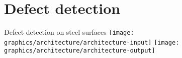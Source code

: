 \section{Defect detection}


\begin{frame}{Defect detection on steel surfaces}
     {
        \texttt{[image: graphics/architecture/architecture-input]}
    }
     {
        \texttt{[image: graphics/architecture/architecture-output]}
    }
\end{frame}






